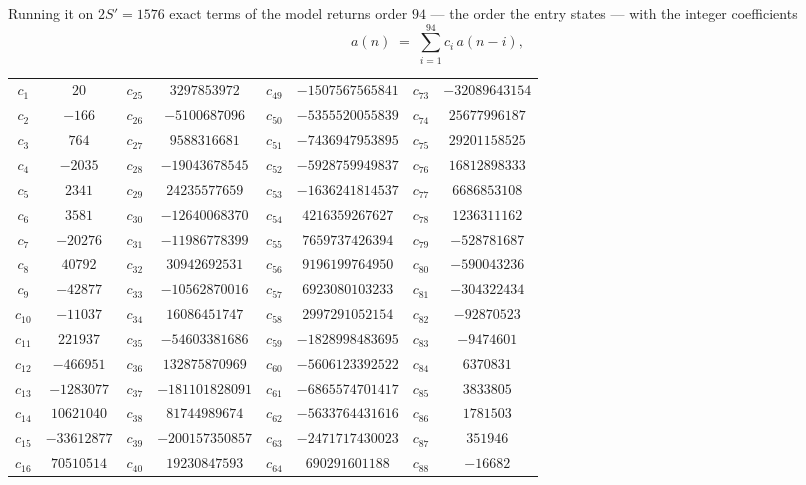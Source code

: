 \documentclass[11pt,a4paper]{article}
\theoremstyle{plain}
\theoremstyle{definition}
\begin{document}
Running it on $2S'=1576$ exact terms of the model returns order $94$ --- the order the
entry states --- with the integer coefficients
\[
a(n)\;=\;\sum_{i=1}^{94}c_i\,a(n-i),
\]
\begin{center}\small
\begin{tabular}{cccccccc}
$c_{1}$ & $20$ & $c_{25}$ & $3297853972$ & $c_{49}$ & $-1507567565841$ & $c_{73}$ & $-32089643154$ \\
$c_{2}$ & $-166$ & $c_{26}$ & $-5100687096$ & $c_{50}$ & $-5355520055839$ & $c_{74}$ & $25677996187$ \\
$c_{3}$ & $764$ & $c_{27}$ & $9588316681$ & $c_{51}$ & $-7436947953895$ & $c_{75}$ & $29201158525$ \\
$c_{4}$ & $-2035$ & $c_{28}$ & $-19043678545$ & $c_{52}$ & $-5928759949837$ & $c_{76}$ & $16812898333$ \\
$c_{5}$ & $2341$ & $c_{29}$ & $24235577659$ & $c_{53}$ & $-1636241814537$ & $c_{77}$ & $6686853108$ \\
$c_{6}$ & $3581$ & $c_{30}$ & $-12640068370$ & $c_{54}$ & $4216359267627$ & $c_{78}$ & $1236311162$ \\
$c_{7}$ & $-20276$ & $c_{31}$ & $-11986778399$ & $c_{55}$ & $7659737426394$ & $c_{79}$ & $-528781687$ \\
$c_{8}$ & $40792$ & $c_{32}$ & $30942692531$ & $c_{56}$ & $9196199764950$ & $c_{80}$ & $-590043236$ \\
$c_{9}$ & $-42877$ & $c_{33}$ & $-10562870016$ & $c_{57}$ & $6923080103233$ & $c_{81}$ & $-304322434$ \\
$c_{10}$ & $-11037$ & $c_{34}$ & $16086451747$ & $c_{58}$ & $2997291052154$ & $c_{82}$ & $-92870523$ \\
$c_{11}$ & $221937$ & $c_{35}$ & $-54603381686$ & $c_{59}$ & $-1828998483695$ & $c_{83}$ & $-9474601$ \\
$c_{12}$ & $-466951$ & $c_{36}$ & $132875870969$ & $c_{60}$ & $-5606123392522$ & $c_{84}$ & $6370831$ \\
$c_{13}$ & $-1283077$ & $c_{37}$ & $-181101828091$ & $c_{61}$ & $-6865574701417$ & $c_{85}$ & $3833805$ \\
$c_{14}$ & $10621040$ & $c_{38}$ & $81744989674$ & $c_{62}$ & $-5633764431616$ & $c_{86}$ & $1781503$ \\
$c_{15}$ & $-33612877$ & $c_{39}$ & $-200157350857$ & $c_{63}$ & $-2471717430023$ & $c_{87}$ & $351946$ \\
$c_{16}$ & $70510514$ & $c_{40}$ & $19230847593$ & $c_{64}$ & $690291601188$ & $c_{88}$ & $-16682$ \\

\end{tabular}
\end{center}
\end{document}
